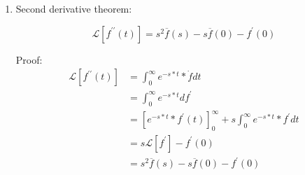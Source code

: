 \documentclass[10pt,a4paper]{article}
\begin{document}
\begin{enumerate}
     \item Second derivative theorem:
     \begin{tcolorbox}[breakable,colback=white,colframe=black,width=\dimexpr\textwidth+12mm\relax,enlarge left by=-6mm]
        \begin{equation*} 
        \mathcal{L}[ f^{\prime \prime}(t)] = s^2\overline{f}(s) - s\overline{f}(0) - f^{\prime}(0)
        \end{equation*}
     \end{tcolorbox}
     Proof: 
     \begin{equation*} 
        \begin{aligned} 
            \mathcal{L}[f^{\prime \prime}(t)]&=\int_0^{\infty}e^{-s*t}*\dot{f} dt \\
            &= \int_0^{\infty}e^{-s*t}df^{\prime} \\
            &= \left[e^{-s*t}*f^{\prime}(t)\right]_0^{\infty} + s\int_0^{\infty}e^{-s*t}*f^{\prime} dt \\
            &= s\mathcal{L}[f^{\prime}]-f^{\prime}(0) \\
            &= s^2\overline{f}(s) - s\overline{f}(0) - f^{\prime}(0)
        \end{aligned}
     \end{equation*}

 \end{enumerate}

 
\end{document}
